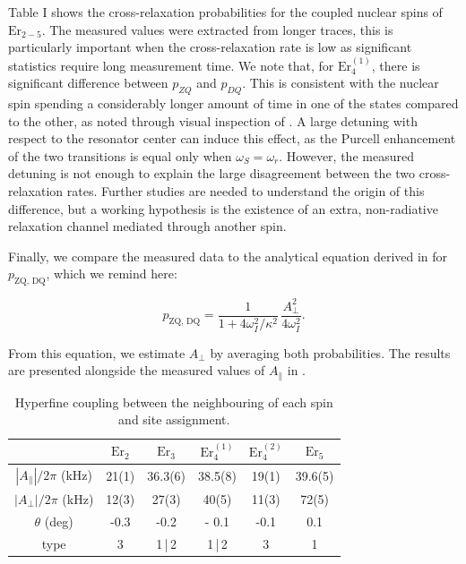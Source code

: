 Table I shows the cross-relaxation probabilities for the coupled nuclear spins of $\mathrm{Er}_{2-5}$. The measured values were extracted from longer traces, this is particularly important when the cross-relaxation rate is low as significant statistics require long measurement time. We note that, for $\mathrm{Er}_{4}^{(1)}$, there is significant difference between $p_{ZQ}$ and $p_{DQ}$. This is consistent with the nuclear spin spending a considerably longer amount of time in one of the states compared to the other, as noted through visual inspection of . A large detuning with respect to the resonator center can induce this effect, as the Purcell enhancement of the two transitions is equal only when $\omega_S=\omega_r$. However, the measured detuning is not enough to explain the large disagreement between the two cross-relaxation rates. Further studies are needed to understand the origin of this difference, but a working hypothesis is the existence of an extra, non-radiative relaxation channel mediated through another \Er spin. 

Finally, we compare the measured data to the analytical equation derived in  for $p_\text{ZQ, DQ}$, which we remind here:

\begin{equation}
     p_\text{ZQ, DQ} = \frac{1}{1 + 4\omega_I^2 / \kappa^2} \, \frac{A_\perp^2}{4\omega_I^2}.
\end{equation}

From this equation, we estimate $A_\perp$ by averaging both probabilities. The results are presented alongside the measured values of $A_\parallel$ in .

\begin{table}
    \centering
    \begin{tabular}{|c|c|c|c|c|c|}
        \hline
        & \textbf{$\mathrm{Er}_2$} & \textbf{$\mathrm{Er}_3$} & \textbf{$\mathrm{Er}_4^{(1)}$} & \textbf{$\mathrm{Er}_4^{(2)}$} & \textbf{$\mathrm{Er}_5$} \\ \hline
        $|A_\parallel|/2\pi$ (kHz)  
        & 21(1) & 36.3(6) & 38.5(8) & 19(1) & 39.6(5) \\ \hline        
        $|A_\perp|/2\pi$ (kHz)  
        & 12(3) & 27(3) & 40(5) & 11(3) & 72(5)  \\ \hline
        $\theta$ (deg) & -0.3 & -0.2 & - 0.1 &-0.1 &0.1 \\ \hline
        type & 3 & 1\,|\,2 &  1\,|\,2 & 3 & 1 \\ \hline
    \end{tabular}
    \caption[Hyperfine coupling measurement]{Hyperfine coupling between the neighbouring \W of each \Er spin and site assignment.}
\end{table}



